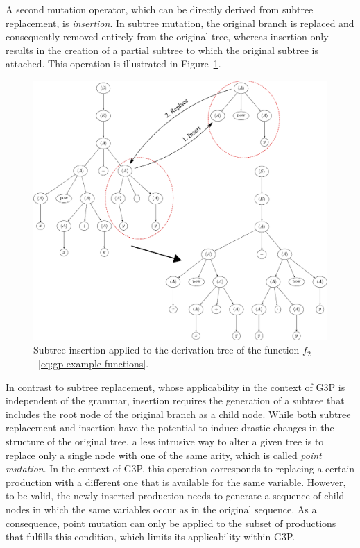 A second mutation operator, which can be directly derived from subtree replacement, is \emph{insertion}.
In subtree mutation, the original branch is replaced and consequently removed entirely from the original tree, whereas insertion only results in the creation of a partial subtree to which the original subtree is attached.
This operation is illustrated in Figure~\ref{fig:gp-insertion-mutation}.
\begin{figure}
	\centering
	\includegraphics[scale=0.395]{figures/trees/subtree_insertion_mutation.pdf}
	\caption{Subtree insertion applied to the derivation tree of the function $f_2$~\eqref{eq:gp-example-functions}.}
	\label{fig:gp-insertion-mutation}
\end{figure}
In contrast to subtree replacement, whose applicability in the context of G3P is independent of the grammar, insertion requires the generation of a subtree that includes the root node of the original branch as a child node.
While both subtree replacement and insertion have the potential to induce drastic changes in the structure of the original tree, a less intrusive way to alter a given tree is to replace only a single node with one of the same arity, which is called \emph{point mutation}.
In the context of G3P, this operation corresponds to replacing a certain production with a different one that is available for the same variable.
However, to be valid, the newly inserted production needs to generate a sequence of child nodes in which the same variables occur as in the original sequence.
As a consequence, point mutation can only be applied to the subset of productions that fulfills this condition, which limits its applicability within G3P.

